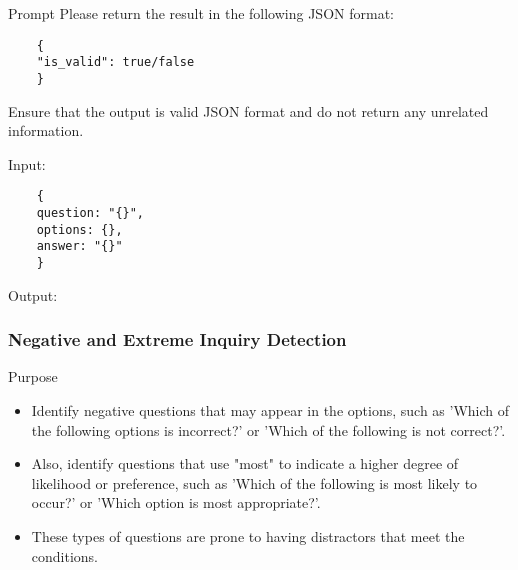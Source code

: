\begin{promptbox}{Prompt}
\vspace{0.5em}  
Please return the result in the following JSON format:

\begin{verbatim}
    {
    "is_valid": true/false
    }
\end{verbatim}
\vspace{-0.5em}  
Ensure that the output is valid JSON format and do not return any unrelated information.

Input:
\begin{verbatim}
    {
    question: "{}",
    options: {},
    answer: "{}"
    }
\end{verbatim}
Output: 
\end{promptbox}


\subsubsection{Negative and Extreme Inquiry Detection}
\begin{purposebox}{Purpose}
\begin{itemize}
    \item Identify negative questions that may appear in the options, such as 'Which of the following options is incorrect?' or 'Which of the following is not correct?'.
    \item Also, identify questions that use "most" to indicate a higher degree of likelihood or preference, such as 'Which of the following is most likely to occur?' or 'Which option is most appropriate?'.
    \item These types of questions are prone to having distractors that meet the conditions.
\end{itemize}
\end{purposebox}

